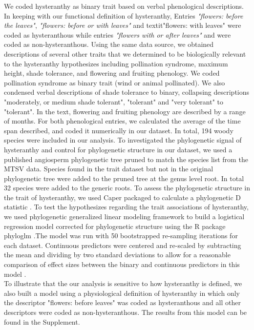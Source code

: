 \documentclass{article}\usepackage[]{graphicx}\usepackage[]{color}
\begin{document}
\indent We coded hysteranthy as binary trait based on verbal phenological descriptions. In keeping with our functional definition of hysteranthy, Entries \textit{"flowers: before the leaves"}, \textit{"flowers: before or with leaves"} and textit{"flowers: with leaves"} were coded as hysteranthous while entries \textit{"flowers with or after leaves"} and  were coded as non-hysteranthous. Using the same data source, we obtained descriptions of several other traits that we determined to be biologically relevant to the hysteranthy hypothesizes including pollination syndrome, maximum height, shade tolerance, and flowering and fruiting phenology. We coded pollination syndrome as binary trait (wind or animal pollinated). We also condensed verbal descriptions of shade tolerance to binary, collapsing descriptions "moderately, or medium shade tolerant", "tolerant" and "very tolerant" to "tolerant". In the text, flowering and fruiting phenology are described by a range of months. For both phenological entries, we calculated the average of the time span described, and coded it numerically in our dataset. In total, 194 woody species were included in our analysis. To investigated the phylogenetic signal of hysteranthy and control for phylogenetic structure in our dataset, we used a published angiosperm phylogenetic tree \citep{Zanne2013} pruned to match the species list from the MTSV data. Species found in the trait dataset but not in the original phylogenetic tree were added to the pruned tree at the genus level root. In total 32 species were added to the generic roots. To assess the phylogenetic structure in the trait of hysteranthy, we used Caper packaged \citep{Orme2013} to calculate a phylogenetic D statistic \citep{Fritz2010}. To test the hypothesizes regarding the trait associations of hysteranthy, we used phylogenetic generalized linear modeling framework \citep{Ives2010} to build a logistical regression model corrected for phylogenetic structure using the R package phyloglm \citep{Ho2014}.The model was run with 50 bootstrapped re-sampling iterations for each dataset. Continuous predictors were centered and re-scaled by subtracting the mean and dividing by two standard deviations to allow for a reasonable comparison of effect sizes between the binary and continuous predictors in this model \citep{Gelman2007}.\\
\ident To illustrate that the our analysis is sensitive to how hysteranthy is defined, we also built a model using a physiological definition of hysteranthy in which only the descriptor "flowers: before leaves" was coded as hysteranthous and all other descriptors were coded as non-hysteranthous. The results from this model can be found in the Supplement.\\
\end{document}
